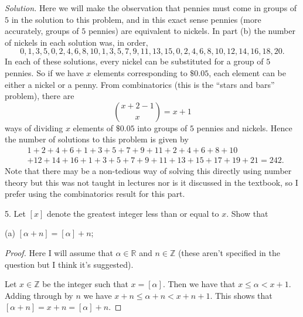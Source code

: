 \documentclass{article}
\newcommand{\R}{\mathbb{R}}
\newcommand{\Z}{\mathbb{Z}}
\begin{document}
\textit{Solution.}
Here we will make the observation that pennies must come in groups of
$5$ in the solution to this problem, and in this exact sense pennies
(more accurately, groups of $5$ pennies) are equivalent to nickels. In
part (b) the number of nickels in each solution was, in order,
%
\begin{equation*}
    0, 1, 3, 5, 0, 2, 4, 6, 8, 10, 1, 3, 5, 7, 9, 11, 13, 15, 0, 2, 4, 6, 8, 10, 12, 14, 16, 18, 20
    .
\end{equation*}
%
In each of these solutions, every nickel can be substituted for a group
of $5$ pennies. So if we have $x$ elements corresponding to $\$0.05$, each
element can be either a nickel or a penny. From combinatorics (this is
the ``stars and bars'' problem), there are
%
\begin{equation*}
    \binom{x + 2 - 1}{x} = x + 1
\end{equation*}
%
ways of dividing $x$ elements of $\$0.05$ into groups of $5$ pennies and
nickels. Hence the number of solutions to this problem is given by
%
\begin{align*}
    &1
    + 2
    + 4
    + 6
    + 1
    + 3
    + 5
    + 7
    + 9
    + 11
    + 2
    + 4
    + 6
    + 8
    + 10
    \\
    &+ 12
    + 14
    + 16
    + 1
    + 3
    + 5
    + 7
    + 9
    + 11
    + 13
    + 15
    + 17
    + 19
    + 21
    = 242
    .
\end{align*}
%
Note that there may be a non-tedious way of solving this directly using
number theory but this was not taught in lectures nor is it discussed in
the textbook, so I prefer using the combinatorics result for this part.

\newpage

5. Let $[x]$ denote the greatest integer less than or equal to $x$. Show that

(a) $[\alpha + n] = [\alpha] + n$;

\begin{proof}

Here I will assume that $\alpha \in \R$ and $n \in \Z$ (these aren't
specified in the question but I think it's suggested).

Let $x \in \Z$ be the integer such that $x = [\alpha]$. Then we have
that $x \leq \alpha < x + 1$. Adding through by $n$ we have $x + n \leq
\alpha + n < x + n + 1$. This shows that
$[\alpha + n] = x + n = [\alpha] + n$.

\end{proof}
\end{document}
